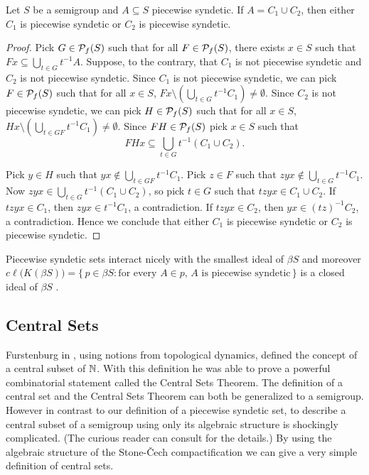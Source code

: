 \begin{thm}
  \label{prop:psReg}
  Let $S$ be a semigroup and $A \subseteq S$ piecewise syndetic.
  If $A = C_1 \cup C_2$, then either $C_1$ is piecewise syndetic or $C_2$ is piecewise syndetic.
\end{thm}
\begin{proof}
  Pick $G \in \mathcal{P}_f(S)$ such that for all $F \in \mathcal{P}_f(S)$, there exists $x \in S$ such that $Fx \subseteq \bigcup_{t \in G} t^{-1}A$. 
  Suppose, to the contrary, that $C_1$ is not piecewise syndetic and $C_2$ is not piecewise syndetic. 
  Since $C_1$ is not piecewise syndetic, we can pick $F \in \mathcal{P}_f(S)$ such that for all $x \in S$, $Fx \setminus (\bigcup_{t \in G} t^{-1}C_1) \ne \emptyset$. 
  Since $C_2$ is not piecewise syndetic, we can pick $H \in \mathcal{P}_f(S)$ such that for all $x \in S$, $Hx \setminus (\bigcup_{t \in GF} t^{-1}C_1) \ne \emptyset$.
  Since $FH \in \mathcal{P}_f(S)$ pick $x \in S$ such that 
  \[
    FHx \subseteq \bigcup_{t \in G} t^{-1}(C_1 \cup C_2). 
  \]
  
  Pick $y \in H$ such that $yx \not\in \bigcup_{t \in GF} t^{-1}C_1$. 
  Pick $z \in F$ such that $zyx \not\in \bigcup_{t \in G} t^{-1}C_1$. 
  Now $zyx \in \bigcup_{t \in G} t^{-1}(C_1 \cup C_2)$, so pick $t \in G$ such that $tzyx \in C_1 \cup C_2$. 
  If $tzyx \in C_1$, then $zyx \in t^{-1}C_1$, a contradiction.
  If $tzyx \in C_2$, then $yx \in (tz)^{-1}C_2$, a contradiction.
  Hence we conclude that either $C_1$ is piecewise syndetic or $C_2$ is piecewise syndetic.
\end{proof}

  Piecewise syndetic sets interact nicely with the smallest ideal of $\beta S$ \cite[Theorem 4.40]{Hindman:1998fk} and moreover $c\ell\bigl(K(\beta S)\bigr) = \{\, p \in \beta S : \mbox{for every $A \in p$, $A$ is piecewise syndetic} \,\}$ is a closed ideal of $\beta S$ \cite[Corollary 4.41 and Theorem 4.44]{Hindman:1998fk}. 

\subsection{Central Sets}

Furstenburg in \cite[Chapter 8]{Furstenberg:1981fk}, using notions from topological dynamics, defined the concept of a central subset of $\mathbb{N}$. 
With this definition he was able to prove a powerful combinatorial statement called the Central Sets Theorem. 
The definition of a central set and the Central Sets Theorem can both be generalized to a semigroup.
However in contrast to our definition of a piecewise syndetic set, to describe a central subset of a semigroup using only its algebraic structure is shockingly complicated.
(The curious reader can consult \cite[Section 14.5]{Hindman:1998fk} for the details.)
By using the algebraic structure of the Stone-\v{C}ech compactification we can give a very simple definition of central sets.

